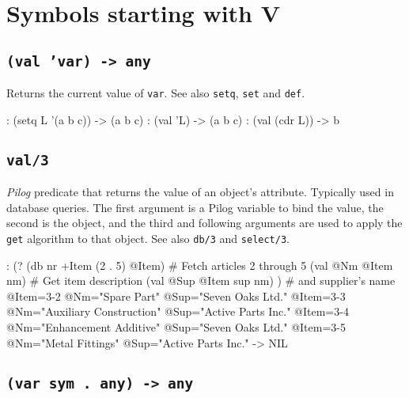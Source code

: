 %
%
%

\chapter{Symbols starting with V}
\label{cha:func-ref-V-functions-starting-with-V}
          
\section*{\texttt{(val 'var) -> any}}
\label{sec:func-ref-V-(val 'var) -> any}


Returns the current value of \texttt{var}. See also \texttt{setq}, \texttt{set} and \texttt{def}.


\begin{wideverbatim}
: (setq L '(a b c))
-> (a b c)
: (val 'L)
-> (a b c)
: (val (cdr L))
-> b
\end{wideverbatim}

 
\section*{\texttt{val/3}}
\label{sec:func-ref-V-val/3}


\emph{Pilog} predicate that returns the value of an
object's attribute. Typically used in database queries. The first
argument is a Pilog variable to bind the value, the second is the
object, and the third and following arguments are used to apply the
\texttt{get} algorithm to that object. See also \texttt{db/3} and \texttt{select/3}.


\begin{wideverbatim}
: (?
   (db nr +Item (2 . 5) @Item)   # Fetch articles 2 through 5
   (val @Nm @Item nm)            # Get item description
   (val @Sup @Item sup nm) )     # and supplier's name
   @Item={3-2} @Nm="Spare Part" @Sup="Seven Oaks Ltd."
   @Item={3-3} @Nm="Auxiliary Construction" @Sup="Active Parts Inc."
   @Item={3-4} @Nm="Enhancement Additive" @Sup="Seven Oaks Ltd."
   @Item={3-5} @Nm="Metal Fittings" @Sup="Active Parts Inc."
-> NIL
\end{wideverbatim}

 
\section*{\texttt{(var sym . any) -> any}}
\label{sec:func-ref-V-(var sym . any) -> any}


